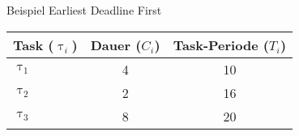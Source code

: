 \newcommand{\showEDFSlide}[1] {\begin{frame}{Beispiel Earliest Deadline First}
	\begin{center}
		\begin{tabular}{l||c|c}
				Task ($\uptau_i$) & Dauer ($C_i$) & Task-Periode ($T_i$)\\\hline\hline
				$\uptau_1$ & 4 & 10\\
				$\uptau_2$ & 2 & 16\\
				$\uptau_3$ & 8 & 20\\
		\end{tabular}
	\end{center}
	
\end{frame}}

%
{%
	\showEDFSlide{\arabic{ct}}
}